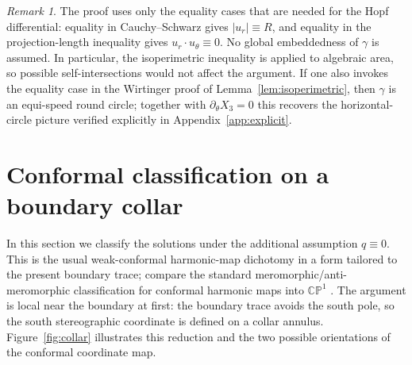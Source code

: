 \documentclass[11pt]{amsart}
\numberwithin{equation}{section}
\theoremstyle{remark}
\newtheorem*{remark}{Remark}
\begin{document}
\begin{remark}
The proof uses only the equality cases that are needed for the Hopf differential: equality in Cauchy--Schwarz gives $|u_r|\equiv R$, and
equality in the projection-length inequality gives $u_r\cdot u_\theta\equiv0$. No global embeddedness of $\gamma$ is assumed. In particular,
the isoperimetric inequality is applied to algebraic area, so possible self-intersections would not affect the argument. If one also invokes
the equality case in the Wirtinger proof of Lemma~\ref{lem:isoperimetric}, then $\gamma$ is an equi-speed round circle; together with
$\partial_\theta X_3=0$ this recovers the horizontal-circle picture verified explicitly in Appendix~\ref{app:explicit}.
\end{remark}

\section{Conformal classification on a boundary collar}\label{sec:conformal}

In this section we classify the solutions under the additional assumption $q\equiv0$. This is the usual weak-conformal harmonic-map dichotomy
in a form tailored to the present boundary trace; compare the standard meromorphic/anti-meromorphic classification for conformal harmonic maps
into $\mathbb{CP}^1$ \cite{EellsWood1983,Helein}. The argument is local near the boundary at first: the boundary trace avoids the south pole,
so the south stereographic coordinate is defined on a collar annulus. Figure~\ref{fig:collar} illustrates this reduction and the two possible
orientations of the conformal coordinate map.
\end{document}
